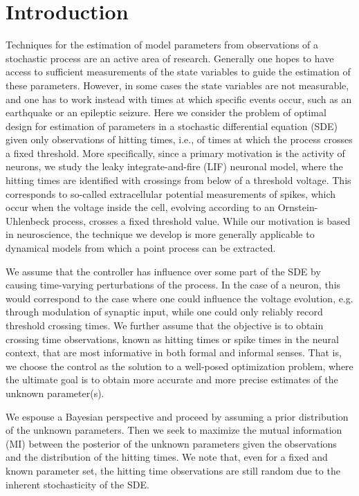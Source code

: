 \documentclass[12pt]{article}
\begin{document}

\section{Introduction}
Techniques for the estimation of model parameters from observations of a
stochastic process are an active area of research. Generally one hopes to have
access to sufficient measurements of the state variables to guide the estimation
of these parameters. However, in some cases the state variables are not
measurable, and one has to work instead with times at which specific events
occur, such as an earthquake or an epileptic seizure. Here we consider the
problem of optimal design for estimation of parameters in a stochastic
differential equation (SDE) given only observations of hitting times, i.e., of
times at which the process crosses a fixed threshold. More specifically, since a
primary motivation is the activity of neurons, we study the leaky
integrate-and-fire (LIF) neuronal model, where the hitting times are identified
with crossings from below of a threshold voltage. This corresponds to so-called
extracellular potential measurements of spikes, which occur when the voltage
inside the cell, evolving according to an Ornstein-Uhlenbeck process, crosses a
fixed threshold value. While our motivation is based in neuroscience, the
technique we develop is more generally applicable to dynamical models from which
a point process can be extracted.

We assume that the controller has influence over some part of the SDE by causing
time-varying perturbations of the process. In the case of a neuron, this would
correspond to the case where one could influence the voltage evolution, e.g.
through modulation of synaptic input, while one could only reliably record
threshold crossing times. We further assume that the objective is to obtain
crossing time observations, known as hitting times or spike times in the neural
context, that are most informative in both formal and informal senses. That is,
we choose the control as the solution to a well-posed optimization problem,
where the ultimate goal is to obtain more accurate and more precise estimates of
the unknown parameter(s).

We espouse a Bayesian perspective and proceed by assuming a prior distribution
of the unknown parameters. Then we seek to maximize the mutual information (MI)
between the posterior of the unknown parameters given the observations and the
distribution of the hitting times. We note that, even for a fixed and known
parameter set, the hitting time observations are still random due to the
inherent stochasticity of the SDE.
\end{document}
